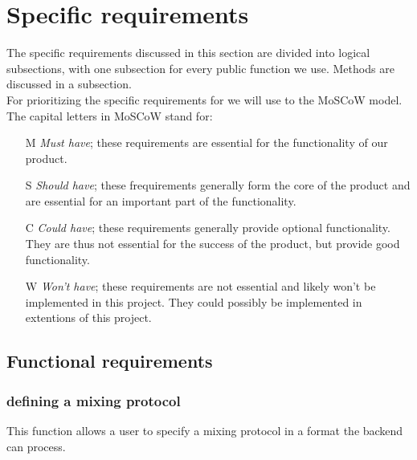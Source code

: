 \chapter{Specific requirements}
The specific requirements discussed in this section are divided into logical subsections, with one subsection for every public function we use. Methods are discussed in a subsection. \\
For prioritizing the specific requirements for \projectname we will use to the MoSCoW model. The capital letters in MoSCoW stand for:
\begin{itemize}
\item[M] \emph{Must have}; these requirements are essential for the functionality of our product.
\item[S] \emph{Should have}; these frequirements generally form the core of the product and are essential for an important part of the functionality.
\item[C] \emph{Could have}; these requirements generally provide optional functionality. They are thus not essential for the success of the product, but provide good functionality.
\item[W] \emph{Won't have}; these requirements are not essential and likely won't be implemented in this project. They could possibly be implemented in extentions of this project.
\end{itemize}

\section{Functional requirements}

\subsection{defining a mixing protocol}
This function allows a user to specify a mixing protocol in a format the backend can process.




